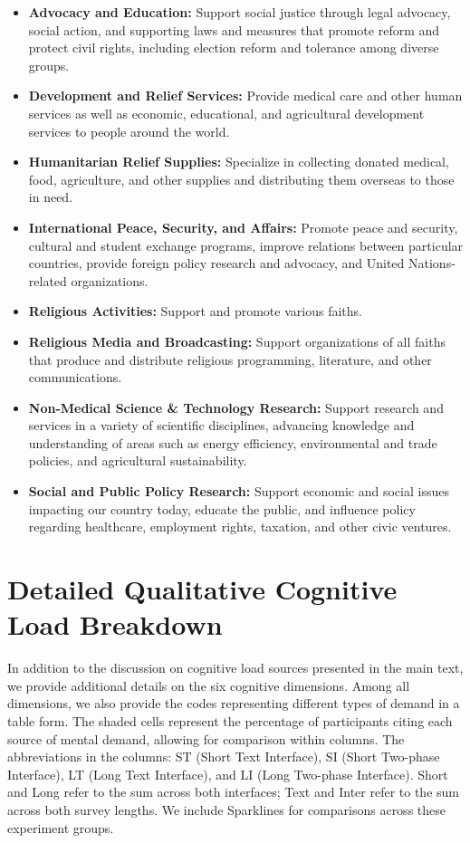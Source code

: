 \begin{itemize}
    \item \textbf{Advocacy and Education:} Support social justice through legal advocacy, social action, and supporting laws and measures that promote reform and protect civil rights, including election reform and tolerance among diverse groups.
    \item \textbf{Development and Relief Services:} Provide medical care and other human services as well as economic, educational, and agricultural development services to people around the world.
    \item \textbf{Humanitarian Relief Supplies:} Specialize in collecting donated medical, food, agriculture, and other supplies and distributing them overseas to those in need.
    \item \textbf{International Peace, Security, and Affairs:} Promote peace and security, cultural and student exchange programs, improve relations between particular countries, provide foreign policy research and advocacy, and United Nations-related organizations.
    \item \textbf{Religious Activities:} Support and promote various faiths.
    \item \textbf{Religious Media and Broadcasting:} Support organizations of all faiths that produce and distribute religious programming, literature, and other communications.
    \item \textbf{Non-Medical Science \& Technology Research:} Support research and services in a variety of scientific disciplines, advancing knowledge and understanding of areas such as energy efficiency, environmental and trade policies, and agricultural sustainability.
    \item \textbf{Social and Public Policy Research:} Support economic and social issues impacting our country today, educate the public, and influence policy regarding healthcare, employment rights, taxation, and other civic ventures.
\end{itemize}

\section{Detailed Qualitative Cognitive Load Breakdown}
\label{apdx:cog_qual}

In addition to the discussion on cognitive load sources presented in the main text, we provide additional details on the six cognitive dimensions. Among all dimensions, we also provide the codes representing different types of demand in a table form. The shaded cells represent the percentage of participants citing each source of mental demand, allowing for comparison within columns. The abbreviations in the columns: ST (Short Text Interface), SI (Short Two-phase Interface), LT (Long Text Interface), and LI (Long Two-phase Interface). Short and Long refer to the sum across both interfaces; Text and Inter refer to the sum across both survey lengths. We include Sparklines for comparisons across these experiment groups.

